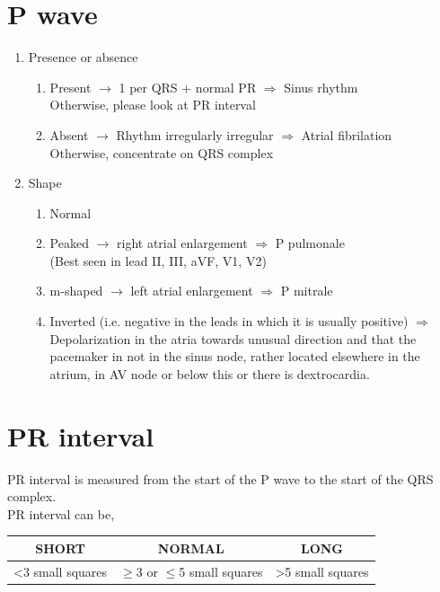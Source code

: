 \documentclass[11pt,a4paper]{report}
\begin{document}
\section{P wave}
\begin{enumerate}
	\item Presence or absence
	\begin{enumerate}
		\item Present $\rightarrow$ 1 per QRS + normal PR $\Rightarrow$ Sinus rhythm \\
		Otherwise, please look at PR interval 
		\item Absent $\rightarrow$ Rhythm irregularly irregular $\Rightarrow$ Atrial fibrilation \\
		Otherwise, concentrate on QRS complex
	\end{enumerate}
	\item Shape 
	\begin{enumerate}
		\item Normal 
		\item Peaked $\rightarrow$ right atrial enlargement $\Rightarrow$ P pulmonale \\(Best seen in lead II, III, aVF, V1, V2)
		\item m-shaped $\rightarrow$ left atrial enlargement $\Rightarrow$ P mitrale
		\item Inverted (i.e. negative in the leads in which it is usually positive) $\Rightarrow$ Depolarization in the atria towards unusual direction and that the pacemaker in not in the sinus node, rather located elsewhere in the atrium, in AV node or below this or there is dextrocardia. 
	\end{enumerate}
\end{enumerate}


\section{PR interval}
PR interval is measured from the start of the P wave to the start of the QRS complex. \\

\noindent PR interval can be, 
\begin{center}
	\begin{tabular}{c|c|c} 
		\toprule[1.5pt]
		SHORT					& NORMAL						& LONG \\ 
		\midrule
		\textless3 small squares & $\geq$3 or $\leq$5 small squares	& \textgreater5 small squares \\ 
		\bottomrule[1.5pt]
	\end{tabular}
\end{center}
\end{document}
